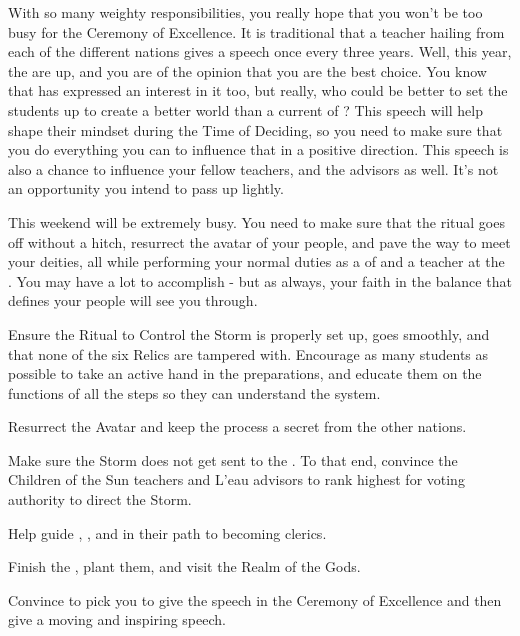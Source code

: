 \documentclass[char]{GL2020}
\begin{document}
With so many weighty responsibilities, you really hope that you won't be too busy for the Ceremony of Excellence. It is traditional that a teacher hailing from each of the different nations gives a speech once every three years. Well, this year, the \pShip{} are up, and you are of the opinion that you are the best choice. You know that \cPirate{} has expressed an interest in it too, but really, who could be better to set the students up to create a better world than a current \cFlowPriest{\cleric} of \cFlowFull{\full}? This speech will help shape their mindset during the Time of Deciding, so you need to make sure that you do everything you can to influence that in a positive direction. This speech is also a chance to influence your fellow teachers, and the advisors as well. It's not an opportunity you intend to pass up lightly.

This weekend will be extremely busy. You need to make sure that the ritual goes off without a hitch, resurrect the avatar of your people, and pave the way to meet your deities, all while performing your normal duties as a \cFlowPriest{\cleric} of \cFlow{} and a teacher at the \pSchool{}. You may have a lot to accomplish - but as always, your faith in the balance that defines your people will see you through. 

\begin{itemz}
	\item Ensure the Ritual to Control the Storm is properly set up, goes smoothly, and that none of the six Relics are tampered with. Encourage as many students as possible to take an active hand in the preparations, and educate them on the functions of all the steps so they can understand the system.
	\item Resurrect the \cEbb{} Avatar and keep the process a secret from the other nations.
	\item Make sure the Storm does not get sent to the \pShip{}. To that end, convince the Children of the Sun teachers and L'eau advisors to rank \cPresident{} highest for voting authority to direct the Storm.
\item Help guide \cInitiate{}, \cWarlordDaughter{}, and \cPirate{} in their path to becoming clerics.
	\item Finish the \iBeansMB{}, plant them, and visit the Realm of the Gods.
\item Convince \cMusic{} to pick you to give the speech in the Ceremony of Excellence and then give a moving and inspiring speech.
\end{itemz}
\end{document}
